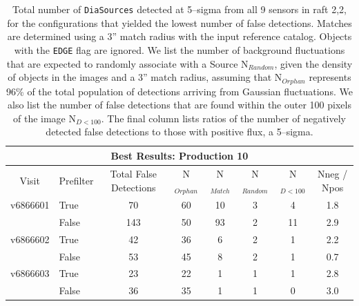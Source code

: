 \documentclass[prd, nofootinbib, floatfix, 11pt,tightenlines,times]{article}
\begin{document}
\begin{table}
\centering
\begin{tabular}{clcccccc}
\hline
\multicolumn{8}{|c|}{Best Results: Production 10} \\
\hline
Visit    & Prefilter & Total False Detections &  N$_{Orphan}$ & N$_{Match}$ & N$_{Random}$ & N$_{D<100}$ & Nneg / Npos \\
\hline
v6866601 & True      & 70      &60         & 10 & 3     & 4   & 1.8 \\ 
         & False     & 143     &50         & 93 & 2     & 11  & 2.9 \\
v6866602 & True      & 42      &36         & 6  & 2     & 1   & 2.2 \\
         & False     & 53      &45         & 8  & 2     & 1   & 0.7 \\
v6866603 & True      & 23      &22         & 1  & 1     & 1   & 2.8 \\
         & False     & 36      &35         & 1  & 1     & 0   & 3.0 \\
\end{tabular}
\caption{Total number of {\tt DiaSources} detected at 5--sigma from
  all 9 sensors in raft 2,2, for the configurations that yielded the
  lowest number of false detections.  Matches are determined using a
  3'' match radius with the input reference catalog.  Objects with the
  {\tt EDGE} flag are ignored.  We list the number of background
  fluctuations that are expected to randomly associate with a Source
  N$_{Random}$, given the density of objects in the images and a 3''
  match radius, assuming that N$_{Orphan}$ represents 96\% of the
  total population of detections arriving from Gaussian fluctuations.
  We also list the number of false detections that are found within
  the outer 100 pixels of the image N$_{D<100}$.  The final column
  lists ratios of the number of negatively detected false detections
  to those with positive flux, a 5--sigma. \label{tab-bestfp10a}}
\end{table}
\end{document}
